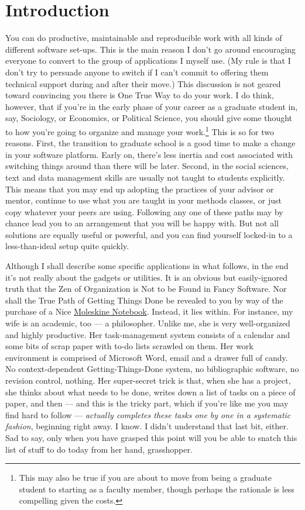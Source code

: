 \documentclass[11pt,article]{memoir}
\begin{document}
\chapter{Introduction} %
\label{sec:introduction}
You can do productive, maintainable and reproducible work with all kinds of different software set-ups. This is the main reason I don't go around encouraging everyone to convert to the group of applications I myself use. (My rule is that I don't try to persuade anyone to switch if I can't commit to offering them technical support during and after their move.) This discussion is not geared toward convincing you there is One True Way to do your work. I do think, however, that if you're in the early phase of your career as a graduate student in, say, Sociology, or Economics, or Political Science, you should give some thought to how you're going to organize and manage your work.\footnote{This may also be true if you are about to move from being a graduate student to starting as a faculty member, though perhaps the rationale is less compelling given the costs.} This is so for two reasons. First, the transition to graduate school is a good time to make a change in your software platform. Early on, there's less inertia and cost associated with switching things around than there will be later. Second, in the social sciences, text and data management skills are usually not taught to students explicitly. This means that you may end up adopting the practices of your advisor or mentor, continue to use what you are taught in your methods classes, or just copy whatever your peers are using. Following any one of these paths may by chance lead you to an arrangement that you will be happy with. But not all solutions are equally useful or powerful, and you can find yourself locked-in to a less-than-ideal setup quite quickly.

Although I shall describe some specific applications in what follows, in the end it's not really about the gadgets or utilities. It is an obvious but easily-ignored truth that the Zen of Organization is Not to be Found in Fancy Software. Nor shall the True Path of Getting Things Done be revealed to you by way of the purchase of a Nice \href{http://www.moleskineus.com/}{Moleskine Notebook}. Instead, it lies within. For instance, my wife is an academic, too --- a philosopher. Unlike me, she is very well-organized and highly productive. Her task-management system consists of a calendar and some bits of scrap paper with to-do lists scrawled on them. Her work environment is comprised of Microsoft Word, email and a drawer full of candy. No context-dependent Getting-Things-Done system, no bibliographic software, no revision control, nothing. Her super-secret trick is that, when she has a project, she thinks about what needs to be done, writes down a list of tasks on a piece of paper, and then --- and this is the tricky part, which if you're like me you may find hard to follow --- \emph{actually completes these tasks one by one in a systematic fashion}, beginning right away. I know. I didn't understand that last bit, either. Sad to say, only when you have grasped this point will you be able to snatch this list of stuff to do today from her hand, grasshopper. 
\end{document}
